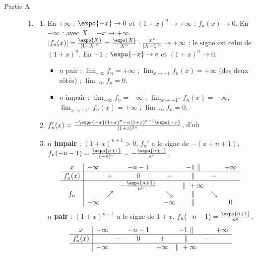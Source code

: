\begin{description}
	\item[Partie A]
	\begin{enumerate}
		\item
		\begin{enumerate}
			\item {}
				En $+\infty$ : $\expo{-x} \to 0$ et $(1+x)^n \to +\infty$ : $f_n(x) \to 0$.
				En $-\infty$ : avec $X = -x \to +\infty$, $|f_n(x)| = \frac{\expo{X}}{|1 - X|^n} = \frac{\expo{X}}{X^n}\cdot\frac{X^n}{|X - 1|^n} \to +\infty$ ; le signe est celui de $(1+x)^n$.
				En $-1$ : $\expo{-x} \to e$ et $(1+x)^n \to 0$.
				\begin{itemize}
					\item $n$ pair : $\lim_{-\infty} f_n = +\infty$ ; $\lim_{x\to -1} f_n(x) = +\infty$ (des deux côtés) ; $\lim_{+\infty} f_n = 0$.
					\item $n$ impair : $\lim_{-\infty} f_n = -\infty$ ; $\lim_{x\to -1^-} f_n(x) = -\infty$, $\lim_{x\to -1^+} f_n(x) = +\infty$ ; $\lim_{+\infty} f_n = 0$.
				\end{itemize}
			\item {}
				$f_n'(x) = \frac{-\expo{-x}(1+x)^n - n(1+x)^{n-1}\expo{-x}}{(1+x)^{2n}}$, d'où
				\par\noindent{}
			\item {}
				\textbf{$n$ impair} : $(1+x)^{n+1} > 0$, $f_n'$ a le signe de $-(x + n + 1)$. $f_n(-n-1) = \frac{\expo{n+1}}{(-n)^n} = -\frac{\expo{n+1}}{n^n}$.
				\[
				\begin{array}{c|ccccccc}
					x & -\infty & & -n-1 & & -1 \ \| & & +\infty \\ \hline
					f_n'(x) & & + & 0 & - & \| & - & \\ \hline
					 & & & -\frac{\expo{n+1}}{n^n} & & \| \ +\infty & & \\
					f_n & & \nearrow & & \searrow & \| & \searrow & \\
					 & -\infty & & & -\infty & \| & & 0
				\end{array}
				\]
				\textbf{$n$ pair} : $(1+x)^{n+1}$ a le signe de $1 + x$. $f_n(-n-1) = \frac{\expo{n+1}}{n^n}$.
				\[
				\begin{array}{c|ccccccc}
					x & -\infty & & -n-1 & & -1 \ \| & & +\infty \\ \hline
					f_n'(x) & & - & 0 & + & \| & - & \\ \hline
					 & +\infty & & & +\infty & \| \ +\infty & & \\

\end{array}\]
\end{enumerate}
\end{enumerate}
\end{description}

